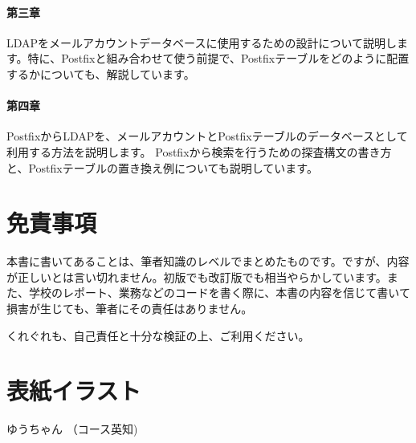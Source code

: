 \paragraph{第三章}
LDAPをメールアカウントデータベースに使用するための設計について説明します。特に、Postfixと組み合わせて使う前提で、Postfixテーブルをどのように配置するかについても、解説しています。

\paragraph{第四章}
PostfixからLDAPを、メールアカウントとPostfixテーブルのデータベースとして利用する方法を説明します。
Postfixから検索を行うための探査構文の書き方と、Postfixテーブルの置き換え例についても説明しています。


\section*{免責事項}
本書に書いてあることは、筆者知識のレベルでまとめたものです。ですが、内容が正しいとは言い切れません。初版でも改訂版でも相当やらかしています。また、学校のレポート、業務などのコードを書く際に、本書の内容を信じて書いて損害が生じても、筆者にその責任はありません。

くれぐれも、自己責任と十分な検証の上、ご利用ください。

\section*{表紙イラスト}
ゆうちゃん （コース英知)